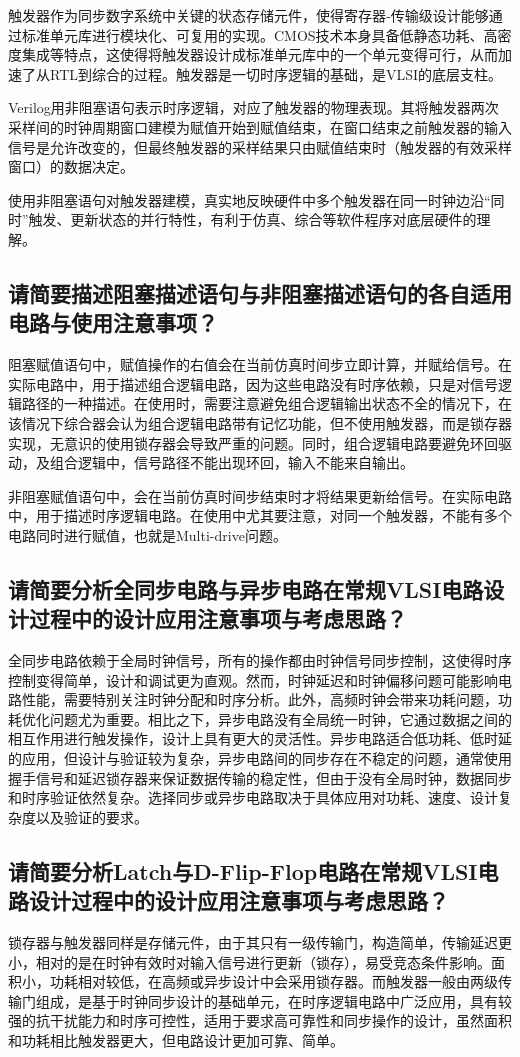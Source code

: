 \documentclass[12pt,a4paper]{ctexart}
\begin{document}
触发器作为同步数字系统中关键的状态存储元件，使得寄存器‐传输级设计能够通过标准单元库进行模块化、可复用的实现。CMOS技术本身具备低静态功耗、高密度集成等特点，这使得将触发器设计成标准单元库中的一个单元变得可行，从而加速了从RTL到综合的过程。触发器是一切时序逻辑的基础，是VLSI的底层支柱。

Verilog用非阻塞语句表示时序逻辑，对应了触发器的物理表现。其将触发器两次采样间的时钟周期窗口建模为赋值开始到赋值结束，在窗口结束之前触发器的输入信号是允许改变的，但最终触发器的采样结果只由赋值结束时（触发器的有效采样窗口）的数据决定。

使用非阻塞语句对触发器建模，真实地反映硬件中多个触发器在同一时钟边沿“同时”触发、更新状态的并行特性，有利于仿真、综合等软件程序对底层硬件的理解。

\subsection{请简要描述阻塞描述语句与非阻塞描述语句的各自适用电路与使用注意事项？}

阻塞赋值语句中，赋值操作的右值会在当前仿真时间步立即计算，并赋给信号。在实际电路中，用于描述组合逻辑电路，因为这些电路没有时序依赖，只是对信号逻辑路径的一种描述。在使用时，需要注意避免组合逻辑输出状态不全的情况下，在该情况下综合器会认为组合逻辑电路带有记忆功能，但不使用触发器，而是锁存器实现，无意识的使用锁存器会导致严重的问题。同时，组合逻辑电路要避免环回驱动，及组合逻辑中，信号路径不能出现环回，输入不能来自输出。

非阻塞赋值语句中，会在当前仿真时间步结束时才将结果更新给信号。在实际电路中，用于描述时序逻辑电路。在使用中尤其要注意，对同一个触发器，不能有多个电路同时进行赋值，也就是Multi-drive问题。

\subsection{请简要分析全同步电路与异步电路在常规VLSI电路设计过程中的设计应用注意事项与考虑思路？}

全同步电路依赖于全局时钟信号，所有的操作都由时钟信号同步控制，这使得时序控制变得简单，设计和调试更为直观。然而，时钟延迟和时钟偏移问题可能影响电路性能，需要特别关注时钟分配和时序分析。此外，高频时钟会带来功耗问题，功耗优化问题尤为重要。相比之下，异步电路没有全局统一时钟，它通过数据之间的相互作用进行触发操作，设计上具有更大的灵活性。异步电路适合低功耗、低时延的应用，但设计与验证较为复杂，异步电路间的同步存在不稳定的问题，通常使用握手信号和延迟锁存器来保证数据传输的稳定性，但由于没有全局时钟，数据同步和时序验证依然复杂。选择同步或异步电路取决于具体应用对功耗、速度、设计复杂度以及验证的要求。

\subsection{请简要分析Latch与D-Flip-Flop电路在常规VLSI电路设计过程中的设计应用注意事项与考虑思路？}

锁存器与触发器同样是存储元件，由于其只有一级传输门，构造简单，传输延迟更小，相对的是在时钟有效时对输入信号进行更新（锁存），易受竞态条件影响。面积小，功耗相对较低，在高频或异步设计中会采用锁存器。而触发器一般由两级传输门组成，是基于时钟同步设计的基础单元，在时序逻辑电路中广泛应用，具有较强的抗干扰能力和时序可控性，适用于要求高可靠性和同步操作的设计，虽然面积和功耗相比触发器更大，但电路设计更加可靠、简单。

\printbibliography
\end{document}
